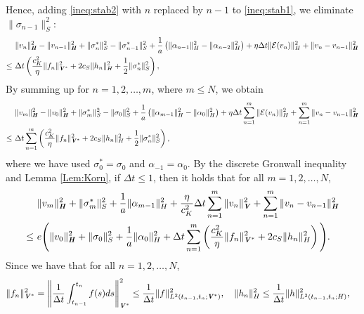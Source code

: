 \documentclass[11pt, a4paper]{article}
\newcommand{\dt}{{\Delta t}}
\newcommand{\E}{{\mathcal{E}}}
\newcommand{\bm}[1]{\textbf{\textit{#1}}}%
\newcommand{\Hv}{{\bm{H}}}
\newcommand{\Vv}{{\bm{V}}}
\newcommand{\Hs}{{H}}
\newcommand{\sigmas}[1]{{\sigma_{#1}^*}}
\begin{document}
Hence, adding \eqref{ineq:stab2} with $n$ replaced by $n-1$ to \eqref{ineq:stab1}, we eliminate $\|\sigma_{n-1}\|_S^2$:
\begin{align*}
  &\|v_n\|_\Hv^2 - \|v_{n-1}\|_\Hv^2
  + \|\sigmas{n}\|_S^2 - \|\sigmas{n-1}\|_S^2
  +\frac{1}{a}\left(\|\alpha_{n-1}\|_\Hs^2 - \|\alpha_{n-2}\|_\Hs^2\right)
  + \eta \dt\|\E(v_n)\|_\Hs^2 + \|v_n - v_{n-1}\|_\Hv^2\\
  \le~& \dt\left(\frac{c_K^2}{\eta}\|f_n\|_{\Vv^*}^2 + 2c_S\|h_n\|_\Hs^2 + \frac{1}{2}\|\sigmas{n}\|_S^2\right),
\end{align*}
By summing up for $n = 1,2,\ldots,m$, where $m\le N$, we obtain
\begin{align*}\begin{aligned}
    &\|v_m\|_\Hv^2 - \|v_0\|_\Hv^2
    + \|\sigmas{m}\|_S^2 - \|\sigma_0\|_S^2
    +\frac{1}{a}\left(\|\alpha_{m-1}\|_\Hs^2 - \|\alpha_0\|_\Hs^2\right)
    + \eta\dt\sum_{n=1}^m\|\E(v_n)\|_\Hs^2 
    + \sum_{n=1}^m\|v_n - v_{n-1}\|_\Hv^2\\
    \le~& \dt\sum_{n=1}^m\left(\frac{c_K^2}{\eta}\|f_n\|_{\Vv^*}^2 + 2c_S\|h_n\|_\Hs^2 + \frac{1}{2}\|\sigmas{n}\|_S^2\right),
\end{aligned}\end{align*}
where we have used $\sigmas{0} = \sigma_0$ and $\alpha_{-1} = \alpha_0$.
By the discrete Gronwall inequality and Lemma \ref{Lem:Korn}, if $\dt\le1$, then it holds that for all $m=1,2,\ldots,N$,
\begin{align*}\begin{aligned}
    &\|v_m\|_\Hv^2 + \|\sigmas{m}\|_S^2 
    +\frac{1}{a}\|\alpha_{m-1}\|_\Hs^2
    + \frac{\eta}{c_K^2}\dt\sum_{n=1}^m\|v_n\|_\Vv ^2 
    + \sum_{n=1}^m\|v_n - v_{n-1}\|_\Hv^2\\
    \le~& e\Bigg(\|v_0\|_\Hv^2 + \|\sigma_0\|_S^2 
    + \frac{1}{a}\|\alpha_0\|_\Hs^2
    + \dt\sum_{n=1}^m\left(\frac{c_K^2}{\eta}\|f_n\|_{\Vv^*}^2 + 2c_S\|h_n\|_\Hs^2\right)\Bigg).
\end{aligned}\end{align*}
Since we have that for all $n=1,2,\ldots,N$,
\begin{align*}\begin{aligned}
    \|f_n\|_{\Vv^*}^2
    &= \left\|\frac{1}{\dt}\int_{t_{n-1}}^{t_n}f(s)ds\right\|_{\Vv^*}^2
    \le \frac{1}{\dt}\|f\|_{L^2(t_{n-1},t_n;\Vv^*)}^2,\quad
    \|h_n\|_{\Hs}^2
    \le \frac{1}{\dt}\|h\|_{L^2(t_{n-1},t_n;\Hs)}^2,
\end{aligned}\end{align*}
\end{document}
